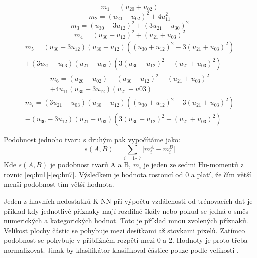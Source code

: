 \documentclass[11pt,twoside,a4paper,table]{book}
\begin{document}
\begin{equation}
m_1 = (u_{20} + u_{02})
\label{eq:hu1}
\end{equation}
\begin{equation}
m_2 = (u_{20} - u_{02})^2 + 4u^2_{11}
\end{equation}
\begin{equation}
m_3 = (u_{30} - 3u_{12})^2 + (3u_{21} - u_{30})^2
\end{equation}
\begin{equation}
m_4 = (u_{30} + u_{12})^2 + (u_{21} + u_{03})^2
\end{equation}
\begin{equation}
\begin{split}
m_5 = (u_{30} - 3u_{12})(u_{30} + u_{12})((u_{30} + u_{12})^2 - 3(u_{21} + u_{03})^2)\\
+ (3u_{21} - u_{03})(u_{21} + u_{03}) (3(u_{30} + u_{12})^2 - (u_{21} + u_{03})^2)
\end{split}
\end{equation}
\begin{equation}
\begin{split}
m_6 = (u_{20} - u_{02}) - (u_{30} + u_{12})^2 - (u_{21} + u_{03})^2 \\
+ 4u_{11}(u_{30} + 3u_{12})(u_{21} + u{03})
\end{split}
\end{equation}
\begin{equation}
\begin{split}
m_7 = (3u_{21} - u_{03})(u_{30} + u_{12}) ((u_{30} + u_{12})^2 - 3(u_{21} + u_{03})^2)\\
- (u_{30} - 3u_{12})(u_{21} + u_{03})(3(u_{30} + u_{12})^2 - (u_{21} + u_{03})^2)
\end{split}
\label{eq:hu7}
\end{equation}

Podobnost jednoho tvaru s druhým pak vypočítáme jako:
\begin{equation}
s(A,B) = \sum_{i=1\cdots 7}\vert m_i^A - m_i^B\vert
\label{eq:shape_similarity}
\end{equation}
Kde $s(A,B)$ je podobnost tvarů A a B, $m_i$ je jeden ze sedmi Hu-momentů z rovnic \ref{eq:hu1}-\ref{eq:hu7}. Výsledkem je hodnota rostoucí od $0$ a platí, že čím větší menší podobnost tím větší hodnota.

Jeden z hlavních nedostatků K-NN při výpočtu vzdálenosti od trénovacích dat je příklad kdy jednotlivé příznaky mají rozdílné škály nebo pokud se jedná o směs numerických a kategorických hodnot. Toto je příklad mnou zvolených příznaků. Velikost plochy částic se pohybuje mezi desítkami až stovkami pixelů. Zatímco podobnost se pohybuje v přibližném rozpětí mezi 0 a 2. Hodnoty je proto třeba normalizovat. Jinak by klasifikátor klasifikoval částice pouze podle velikosti \cite{flusser2000} \cite{art:objrec2d}.
\end{document}
